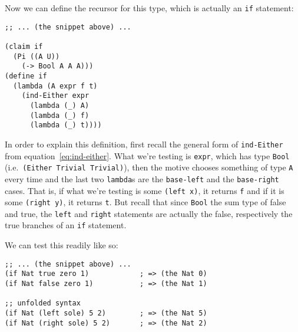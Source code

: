 Now we can define the recursor for this type, which is actually an \texttt{if}
statement:
{
  \small
\begin{verbatim}
;; ... (the snippet above) ...

(claim if
  (Pi ((A U))
    (-> Bool A A A)))
(define if
  (lambda (A expr f t)
    (ind-Either expr
      (lambda (_) A)
      (lambda (_) f)
      (lambda (_) t))))
\end{verbatim}
}

In order to explain this definition, first recall the general form
of \texttt{ind-Either} from equation~\eqref{eq:ind-either}. What we're testing
is \texttt{expr}, which has type \texttt{Bool} (i.e.\ \texttt{(Either Trivial Trivial)}),
then the motive chooses something of type \texttt{A} every time and the last
two \texttt{lambda}s are the \texttt{base-left} and the \texttt{base-right} cases.
That is, if what we're testing is some \texttt{(left x)}, it returns \texttt{f}
and if it is some \texttt{(right y)}, it returns \texttt{t}. But recall that
since \texttt{Bool} the sum type of false and true, the \texttt{left} and
\texttt{right} statements are actually the false, respectively the true branches
of an \texttt{if} statement.

We can test this readily like so:
{
  \small
\begin{verbatim}
;; ... (the snippet above) ...
(if Nat true zero 1)            ; => (the Nat 0)
(if Nat false zero 1)           ; => (the Nat 1)

;; unfolded syntax
(if Nat (left sole) 5 2)        ; => (the Nat 5)
(if Nat (right sole) 5 2)       ; => (the Nat 2)
\end{verbatim}
}



